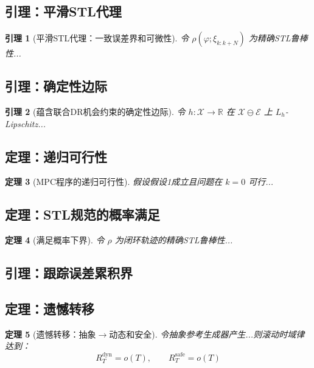 \documentclass[12pt,a4paper]{ctexart}
\numberwithin{equation}{section}
\newtheorem{theorem}{定理}[section]
\newtheorem{lemma}[theorem]{引理}
\begin{document}
\subsection{引理：平滑STL代理}

\begin{lemma}[平滑STL代理：一致误差界和可微性]
    令 $\rho(\varphi;\xi_{k:k+N})$ 为精确STL鲁棒性...
\end{lemma}

\subsection{引理：确定性边际}

\begin{lemma}[蕴含联合DR机会约束的确定性边际]
    令 $h:\mathcal{X}\to\mathbb{R}$ 在 $\mathcal{X}\ominus\mathcal{E}$ 上 $L_h$-Lipschitz...
\end{lemma}

\subsection{定理：递归可行性}

\begin{theorem}[MPC程序的递归可行性]
    假设假设1成立且问题在 $k=0$ 可行...
\end{theorem}

\subsection{定理：STL规范的概率满足}

\begin{theorem}[满足概率下界]
    令 $\rho$ 为闭环轨迹的精确STL鲁棒性...
\end{theorem}

\subsection{引理：跟踪误差累积界}

\subsection{定理：遗憾转移}

\begin{theorem}[遗憾转移：抽象$\to$动态和安全]
    令抽象参考生成器产生...则滚动时域律达到：
    \begin{equation}
        R_T^{\mathrm{dyn}}=o(T),\qquad R_T^{\mathrm{safe}}=o(T)
    \end{equation}
\end{theorem}
\end{document}
